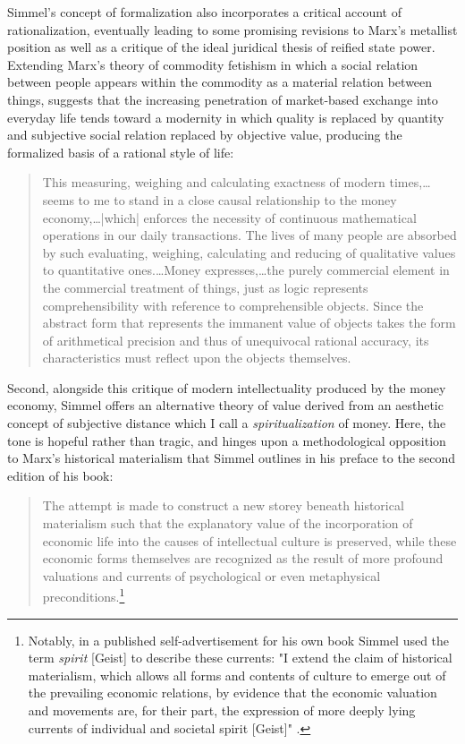 Simmel's concept of formalization also incorporates a critical account of rationalization, eventually leading to some promising revisions to Marx's metallist position as well as a critique of the ideal juridical thesis of reified state power. Extending Marx's theory of commodity fetishism in which a social relation between people appears within the commodity as a material relation between things, \citeauthor{Simmel04} suggests that the increasing penetration of market-based exchange into everyday life tends toward a modernity in which quality is replaced by quantity and subjective social relation replaced by objective value, producing the formalized basis of a rational style of life:
\blockcquote[448--50]{Simmel04}{
  This measuring, weighing and calculating exactness of modern times,…seems to me to stand in a close causal relationship to the money economy,…|which| enforces the necessity of continuous mathematical operations in our daily transactions. The lives of many people are absorbed by such evaluating, weighing, calculating and reducing of qualitative values to quantitative ones.…Money expresses,…the purely commercial element in the commercial treatment of things, just as logic represents comprehensibility with reference to comprehensible objects. Since the abstract form that represents the immanent value of objects takes the form of arithmetical precision and thus of unequivocal rational accuracy, its characteristics must reflect upon the objects themselves.
}
Second, alongside this critique of modern intellectuality produced by the money economy, Simmel offers an alternative theory of value derived from an aesthetic concept of subjective distance which I call a \emph{spiritualization} of money. Here, the tone is hopeful rather than tragic, and hinges upon a methodological opposition to Marx's historical materialism that Simmel outlines in his preface to the second edition of his book:
\blockcquote[54]{Simmel04}{
  The attempt is made to construct a new storey beneath historical materialism such that the explanatory value of the incorporation of economic life into the causes of intellectual culture is preserved, while these economic forms themselves are recognized as the result of more profound valuations and currents of psychological or even metaphysical preconditions.\footnote{
    Notably, in a published self-advertisement for his own book Simmel used the term \emph{spirit} [Geist] to describe these currents: "I extend the claim of historical materialism, which allows all forms and contents of culture to emerge out of the prevailing economic relations, by evidence that the economic valuation and movements are, for their part, the expression of more deeply lying currents of individual and societal spirit [Geist]" \autocite[qtd.~in][526]{Frisby04}.
  }
}
